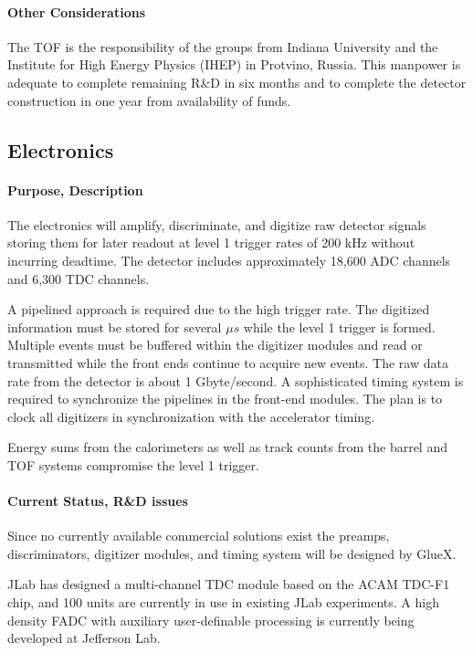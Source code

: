 \documentclass[11pt]{article}
\begin{document}
\paragraph{Other Considerations}

The TOF is the responsibility of the groups from Indiana University and the Institute for High Energy Physics
(IHEP) in Protvino, Russia.  This manpower is adequate to complete remaining R\&D in six months and to complete the
detector construction in one year from availability of funds.


\subsection{Electronics}

\paragraph{Purpose, Description}

The electronics will amplify, discriminate, and digitize raw detector signals
storing them for later readout at level 1 trigger rates of 200 kHz
without incurring deadtime.  The detector includes
approximately 18,600 ADC channels and 6,300 TDC channels.

A pipelined approach is required due to the high trigger rate.  The
digitized information must be stored for several $ \mu s $ while the
level 1 trigger is formed.  Multiple events must be buffered within
the digitizer modules and read or transmitted while the front ends continue to
acquire new events.  The raw data rate from the detector is about 1
Gbyte/second. A sophisticated timing system is required to synchronize the
pipelines in the front-end modules.  The plan is to clock all digitizers in synchronization
with the accelerator timing.

Energy sums from the calorimeters as well as track counts from the barrel and TOF systems
compromise the level 1 trigger.



\paragraph{Current Status, R\&D issues}


Since no currently available commercial solutions exist the 
preamps, discriminators, digitizer modules, and timing system
will be designed by GlueX.

JLab has designed a multi-channel TDC module based on the ACAM TDC-F1
chip, and 100 units are currently in use in existing JLab experiments.  A high density
FADC with auxiliary user-definable processing is currently being developed at
Jefferson Lab.
\end{document}
